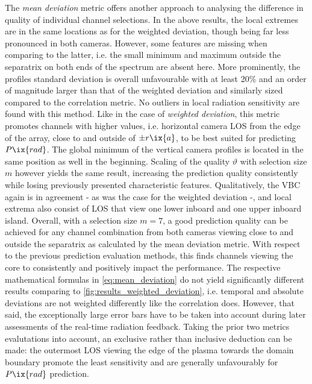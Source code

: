                 The \textit{mean deviation} metric offers another approach to analysing the difference in quality of individual channel selections. In the above results, the local extremes are in the same locations as for the weighted deviation, though being far less pronounced in both cameras. However, some features are missing when comparing to the latter, i.e. the small minimum and maximum outside the separatrix on both ends of the spectrum are absent here. More prominently, the profiles standard deviation is overall unfavourable with at least 20\% and an order of magnitude larger than that of the weighted deviation and similarly sized compared to the correlation metric. No outliers in local radiation sensitivity are found with this method. Like in the case of \textit{weighted deviation}, this metric promotes channels with higher values, i.e. horizontal camera LOS from the edge of the array, close to and outside of $\pm r\ix{a}$, to be best suited for predicting $P\ix{rad}$. The global minimum of the vertical camera profiles is located in the same position as well in the beginning. Scaling of the quality $\vartheta$ with selection size $m$ however yields the same result, increasing the prediction quality consistently while losing previously presented characteristic features. Qualitatively, the VBC again is in agreement - as was the case for the weighted deviation -, and local extrema also consist of LOS that view one lower inboard and one upper inboard island. Overall, with a selection size $m=7$, a good prediction quality can be achieved for any channel combination from both cameras viewing close to and outside the separatrix as calculated by the mean deviation metric. With respect to the previous prediction evaluation methods, this finds channels viewing the core to consistently and positively impact the performance. The respective mathematical formulas in \cref{eq:mean_deviation} do not yield significantly different results comparing to \cref{fig:results_weighted_deviation}, i.e. temporal and absolute deviations are not weighted differently like the correlation does. However, that said, the exceptionally large error bars have to be taken into account during later assessments of the real-time radiation feedback. Taking the prior two metrics evalutations into account, an exclusive rather than inclusive deduction can be made: the outermost LOS viewing the edge of the plasma towards the domain boundary promote the least sensitivity and are generally unfavourably for $P\ix{rad}$ prediction.%
%
